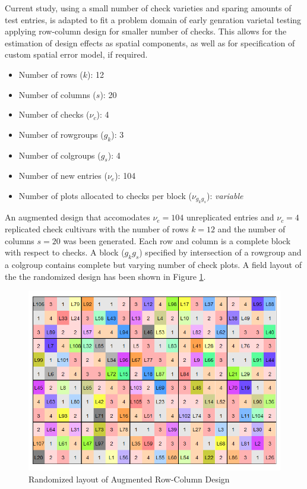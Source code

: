 \documentclass[12pt,oneside]{dukestatscithesis} %
\theoremstyle{definition}
\theoremstyle{definition}
\theoremstyle{definition}
\theoremstyle{remark}
\begin{document}
Current study, using a small number of check varieties and sparing
amounts of test entries, is adapted to fit a problem domain of early
genration varietal testing applying row-column design for smaller number
of checks. This allows for the estimation of design effects as spatial
components, as well as for specification of custom spatial error model,
if required.
\begin{itemize}
\item
  Number of rows (\(k\)): 12
\item
  Number of columns (\(s\)): 20
\item
  Number of checks (\(\nu_{\textit{c}}\)): 4
\item
  Number of rowgroups (\(g_k\)): 3
\item
  Number of colgroups (\(g_s\)): 4
\item
  Number of new entries (\(\nu_{\textit{e}}\)): 104
\item
  Number of plots allocated to checks per block (\(\nu_{g_{k}g_{s}}\)):
  \emph{variable}
\end{itemize}
An augmented design that accomodates \(\nu_{\textit{e}}=104\)
unreplicated entries and \(\nu_{\textit{c}}=4\) replicated check
cultivars with the number of rows \(\textit{k} = 12\) and the number of
columns \(\textit{s} = 20\) was been generated. Each row and column is a
complete block with respect to checks. A block (\(g_{k}g_{s}\))
specified by intersection of a rowgroup and a colgroup contains complete
but varying number of check plots. A field layout of the the randomized
design has been shown in Figure \ref{fig:augmented-layout}.
\begin{figure}

{\centering \includegraphics[width=0.9\linewidth]{./images/design_layout} 

}

\caption{Randomized layout of Augmented Row-Column Design}\label{fig:augmented-layout}
\end{figure}
\end{document}
